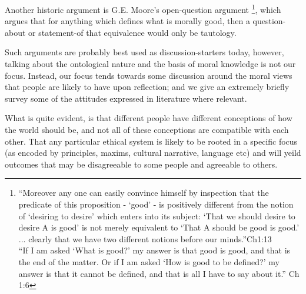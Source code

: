 Another historic argument is G.E. Moore's open-question argument \cite{MooreGutenberg}\footnote{
``Moreover any one can easily convince himself by inspection that the predicate of this proposition - `good' - is positively different from the notion of `desiring to desire' which enters into its subject: `That we should desire to desire A is good' is not merely equivalent to `That A should be good is good.' ... clearly that we have two different notions before our minds.''Ch1:13\\
``If I am asked `What is good?' my answer is that good is good, and that is the end of the matter. Or if I am asked `How is good to be defined?' my answer is that it cannot be defined, and that is all I have to say about it.'' Ch 1:6}, which argues that for anything which defines what is morally good, then a question-about or statement-of that equivalence would only be tautology.

Such arguments are probably best used as discussion-starters today, however, talking about the ontological nature and the basis of moral knowledge is not our focus.
Instead, our focus tends towards some discussion around the moral views that people are likely to have upon reflection; and we give an extremely briefly survey some of the attitudes expressed in literature where relevant.

What is quite evident, is that different people have different conceptions of how the world should be, and not all of these conceptions are compatible with each other.
That any particular ethical system is likely to be rooted in a specific focus (as encoded by principles, maxims, cultural narrative, language etc) and will yeild outcomes that may be disagreeable to some people and agreeable to others.


